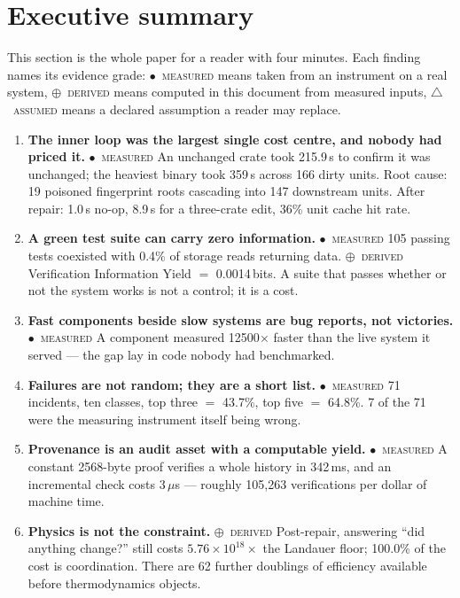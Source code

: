 \documentclass[11pt,a4paper]{article}
\newcommand{\stM}{\textcolor{sigilcyan}{$\bullet$}~{\scriptsize\textsc{measured}}}
\newcommand{\stD}{\textcolor{sigilviolet}{$\oplus$}~{\scriptsize\textsc{derived}}}
\newcommand{\stA}{\textcolor{sigilamber}{$\triangle$}~{\scriptsize\textsc{assumed}}}
\newcommand{\brief}[3]{\begin{tcolorbox}[colback=panelbg,colframe=#1,boxrule=0.8pt,arc=2pt,title=\textbf{#2},coltitle=white,colbacktitle=#1]#3\end{tcolorbox}}
\begin{document}
\section{Executive summary}
This section is the whole paper for a reader with four minutes. Each finding names its evidence grade: \stM{} means taken from an instrument on a real system, \stD{} means computed in this document from measured inputs, \stA{} means a declared assumption a reader may replace.


\brief{sigilblue}{Findings}{\begin{enumerate}[leftmargin=1.5em,itemsep=3pt]
\item \textbf{The inner loop was the largest single cost centre, and nobody had priced it.} \stM{} An unchanged crate took 215.9\,s to confirm it was unchanged; the heaviest binary took 359\,s across 166 dirty units. Root cause: 19 poisoned fingerprint roots cascading into 147 downstream units. After repair: 1.0\,s no-op, 8.9\,s for a three-crate edit, 36\% unit cache hit rate.
\item \textbf{A green test suite can carry zero information.} \stM{} 105 passing tests coexisted with 0.4\% of storage reads returning data. \stD{} Verification Information Yield $=$ 0.0014\,bits. A suite that passes whether or not the system works is not a control; it is a cost.
\item \textbf{Fast components beside slow systems are bug reports, not victories.} \stM{} A component measured 12500$\times$ faster than the live system it served --- the gap lay in code nobody had benchmarked.
\item \textbf{Failures are not random; they are a short list.} \stM{} 71 incidents, ten classes, top three $=$ 43.7\%, top five $=$ 64.8\%. 7 of the 71 were the measuring instrument itself being wrong.
\item \textbf{Provenance is an audit asset with a computable yield.} \stM{} A constant 2568-byte proof verifies a whole history in 342\,ms, and an incremental check costs 3\,$\mu$s --- roughly 105{,}263 verifications per dollar of machine time.
\item \textbf{Physics is not the constraint.} \stD{} Post-repair, answering ``did anything change?'' still costs $5.76\times10^{18}\times$ the Landauer floor; 100.0\% of the cost is coordination. There are 62 further doublings of efficiency available before thermodynamics objects.
\end{enumerate}}
\end{document}
